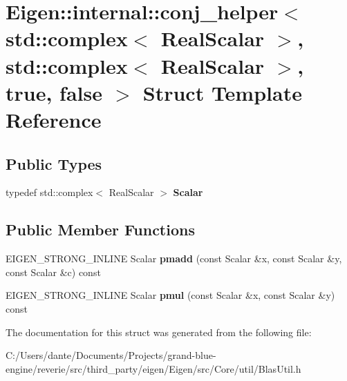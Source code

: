 \hypertarget{struct_eigen_1_1internal_1_1conj__helper_3_01std_1_1complex_3_01_real_scalar_01_4_00_01std_1_1coc8c8eb305908066796b4a168e94f9c59}{}\section{Eigen\+::internal\+::conj\+\_\+helper$<$ std\+::complex$<$ Real\+Scalar $>$, std\+::complex$<$ Real\+Scalar $>$, true, false $>$ Struct Template Reference}
\label{struct_eigen_1_1internal_1_1conj__helper_3_01std_1_1complex_3_01_real_scalar_01_4_00_01std_1_1coc8c8eb305908066796b4a168e94f9c59}
\subsection*{Public Types}
\begin{DoxyCompactItemize}
\item 
\mbox{\label{struct_eigen_1_1internal_1_1conj__helper_3_01std_1_1complex_3_01_real_scalar_01_4_00_01std_1_1coc8c8eb305908066796b4a168e94f9c59_a1922c9c71ad6d01e2f810d24fbc7a144}} 
typedef std\+::complex$<$ Real\+Scalar $>$ {\bfseries Scalar}
\end{DoxyCompactItemize}
\subsection*{Public Member Functions}
\begin{DoxyCompactItemize}
\item 
\mbox{\label{struct_eigen_1_1internal_1_1conj__helper_3_01std_1_1complex_3_01_real_scalar_01_4_00_01std_1_1coc8c8eb305908066796b4a168e94f9c59_a392744309fe85b0c762c2c14cdd8148b}} 
E\+I\+G\+E\+N\+\_\+\+S\+T\+R\+O\+N\+G\+\_\+\+I\+N\+L\+I\+NE Scalar {\bfseries pmadd} (const Scalar \&x, const Scalar \&y, const Scalar \&c) const
\item 
\mbox{\label{struct_eigen_1_1internal_1_1conj__helper_3_01std_1_1complex_3_01_real_scalar_01_4_00_01std_1_1coc8c8eb305908066796b4a168e94f9c59_ac0f9c5aa9c4a5d75d13ab0a4a2f6bc7f}} 
E\+I\+G\+E\+N\+\_\+\+S\+T\+R\+O\+N\+G\+\_\+\+I\+N\+L\+I\+NE Scalar {\bfseries pmul} (const Scalar \&x, const Scalar \&y) const
\end{DoxyCompactItemize}


The documentation for this struct was generated from the following file\+:\begin{DoxyCompactItemize}
\item 
C\+:/\+Users/dante/\+Documents/\+Projects/grand-\/blue-\/engine/reverie/src/third\+\_\+party/eigen/\+Eigen/src/\+Core/util/Blas\+Util.\+h\end{DoxyCompactItemize}
